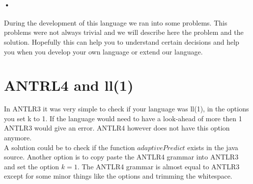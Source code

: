 \paragraph{•}
During the development of this language we ran into some problems. This problems were not always trivial and we will describe here the problem and the solution. Hopefully this can help you to understand certain decisions and help you when you develop your own language or extend our language.
\section{ANTRL4 and ll(1)}
In ANTLR3 it was very simple to check if your language was ll(1), in the options you set k to 1. If the language would need to have a look-ahead of more then 1 ANTLR3 would give an error. ANTLR4 however does not have this option anymore. \\
A solution could be to check if the function $adaptivePredict$ exists in the java source. Another option is to copy paste the ANTLR4 grammar into ANTLR3 and set the option $k=1$. The ANTLR4 grammar is almost equal to ANTLR3 except for some minor things like the options and trimming the whitespace.